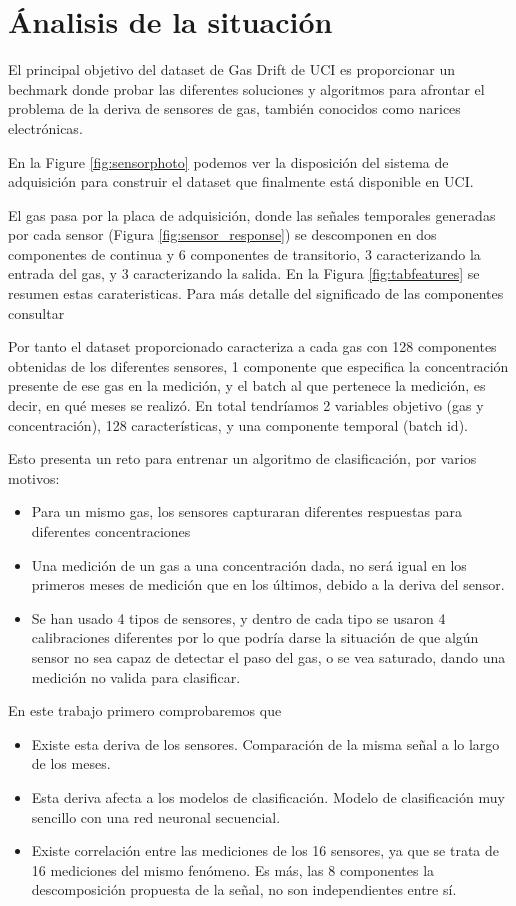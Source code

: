 \chapter{Ánalisis de la situación}

El principal objetivo del dataset de Gas Drift de UCI es proporcionar un bechmark donde probar las diferentes soluciones
y algoritmos para afrontar el problema de la deriva de sensores de gas, también conocidos como narices electrónicas.

En la Figure \ref{fig:sensorphoto} \cite{Zhao2019} podemos ver la disposición del sistema de adquisición para construir el dataset que finalmente está disponible en UCI.

El gas pasa por la placa de adquisición, donde las señales temporales generadas por cada sensor (Figura \ref{fig:sensor_response}) se descomponen en dos componentes de continua y 6 componentes de transitorio, 3 caracterizando la entrada del gas, y 3 caracterizando la salida. En la Figura \ref{fig:tabfeatures} se resumen estas carateristicas. Para más detalle del significado de las componentes consultar \cite{Vergara2011}

Por tanto el dataset proporcionado caracteriza a cada gas con 128 componentes obtenidas de los diferentes sensores, 1 componente que especifica la concentración presente de ese gas en la medición, y el batch al que pertenece la medición, es decir,
en qué meses se realizó. En total tendríamos 2 variables objetivo (gas y concentración), 128 características, y una componente temporal (batch id).

Esto presenta un reto para entrenar un algoritmo de clasificación, por varios motivos:
\begin{itemize}
\item Para un mismo gas, los sensores capturaran diferentes respuestas para diferentes concentraciones
\item Una medición de un gas a una concentración dada, no será igual en los primeros meses de medición que en los últimos, debido a la deriva del sensor.
\item Se han usado 4 tipos de sensores, y dentro de cada tipo se usaron 4 calibraciones diferentes \cite{Zhao2019} por lo que podría darse la situación de que algún sensor no sea capaz de detectar el paso del gas, o se vea saturado, dando una medición no valida para clasificar.
\end{itemize}

En este trabajo primero comprobaremos que
\begin{itemize}
	\item Existe esta deriva de los sensores. Comparación de la misma señal a lo largo de los meses.
	\item Esta deriva afecta a los modelos de clasificación. Modelo de clasificación muy sencillo con una red neuronal secuencial.
	\item Existe correlación entre las mediciones de los 16 sensores, ya que se trata de 16 mediciones del mismo fenómeno. Es más, las 8 componentes la descomposición propuesta de la señal, no son independientes entre sí.
\end{itemize}

